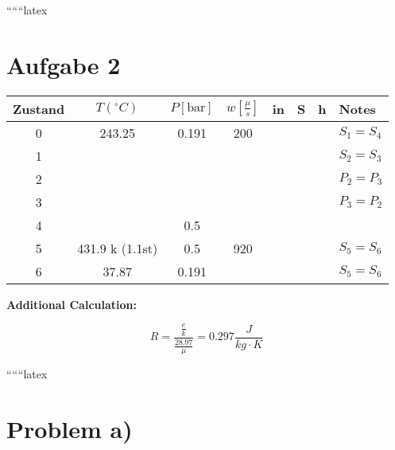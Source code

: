 
``````latex


\section*{Aufgabe 2}

\begin{tabular}{|c|c|c|c|c|c|c|}
\hline
Zustand & $T \left( ^{\circ}C \right)$ & $P \left[ \text{bar} \right]$ & $w \left[ \frac{\mu}{s} \right]$ & in & S & h & Notes \\
 & 243.25 & 0.191 & 200 & & & & $S_1 = S_4$ \\
 & & & & & & & $S_2 = S_3$ \\
 & & & & & & & $P_2 = P_3$ \\
 & & & & & & & $P_3 = P_2$ \\
 & & 0.5 & & & & & \\
 & 431.9 k (1.1st) & 0.5 & 920 & & & & $S_5 = S_6$ \\
 & 37.87 & 0.191 & & & & & $S_5 = S_6$ \\
\hline
\end{tabular}

\bigskip

\noindent
\textbf{Additional Calculation:}

\[
R = \frac{\frac{e}{k}}{\frac{28.97}{\mu}} = 0.297 \frac{J}{kg \cdot K}
\]

``````latex


\section*{Problem a)}

